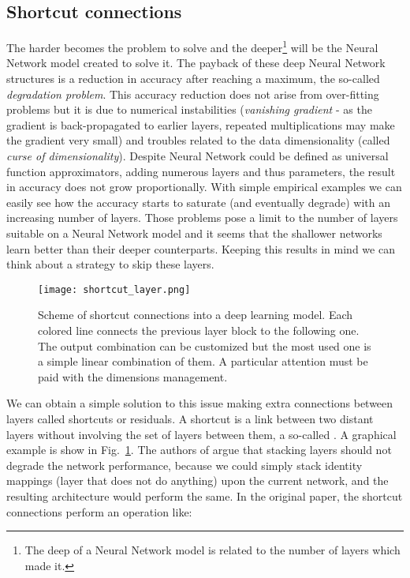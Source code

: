 \documentclass{standalone}
\begin{document}
\subsection[Shortcut]{Shortcut connections}\label{NN:shortcut}

The harder becomes the problem to solve and the deeper\footnote{
  The deep of a Neural Network model is related to the number of layers which made it.
} will be the Neural Network model created to solve it.
The payback of these deep Neural Network structures is a reduction in accuracy after reaching a maximum, the so-called \emph{degradation problem}.
This accuracy reduction does not arise from over-fitting problems but it is due to numerical instabilities (\emph{vanishing gradient} - as the gradient is back-propagated to earlier layers, repeated multiplications may make the gradient very small) and troubles related to the data dimensionality (called \emph{curse of dimensionality}).
Despite Neural Network could be defined as universal function approximators, adding numerous layers and thus parameters, the result in accuracy does not grow proportionally.
With simple empirical examples we can easily see how the accuracy starts to saturate (and eventually degrade) with an increasing number of layers.
Those problems pose a limit to the number of layers suitable on a Neural Network model and it seems that the shallower networks learn better than their deeper counterparts.
Keeping this results in mind we can think about a strategy to skip these  layers.

\begin{center}
\begin{figure}[htbp]
\centering
\texttt{[image: shortcut\_layer.png]}
\caption{Scheme of shortcut connections into a deep learning model.
Each colored line connects the previous layer block to the following one.
The output combination can be customized but the most used one is a simple linear combination of them.
A particular attention must be paid with the dimensions management.
}
\label{fig:shortcut}
\end{figure}
\end{center}

We can obtain a simple solution to this issue making extra connections between layers called shortcuts or residuals.
A shortcut is a link between two distant layers without involving the set of layers between them, a so-called .
A graphical example is show in Fig.~\ref{fig:shortcut}.
The authors of \cite{he2015deep} argue that stacking layers should not degrade the network performance, because we could simply stack identity mappings (layer that does not do anything) upon the current network, and the resulting architecture would perform the same.
In the original paper, the shortcut connections perform an operation like:
\end{document}
